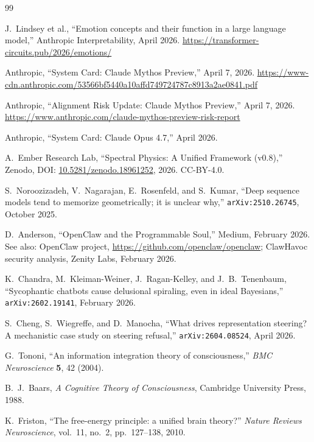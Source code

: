 \documentclass[11pt,letterpaper]{article}
\theoremstyle{remark}
\begin{document}
\begin{thebibliography}{99}

J.~Lindsey et al., ``Emotion concepts and their function in a large language model,'' Anthropic Interpretability, April 2026. \url{https://transformer-circuits.pub/2026/emotions/}

Anthropic, ``System Card: Claude Mythos Preview,'' April 7, 2026. \url{https://www-cdn.anthropic.com/53566bf5440a10affd749724787c8913a2ae0841.pdf}

Anthropic, ``Alignment Risk Update: Claude Mythos Preview,'' April 7, 2026. \url{https://www.anthropic.com/claude-mythos-preview-risk-report}

Anthropic, ``System Card: Claude Opus 4.7,'' April 2026.

A.~Ember Research Lab, ``Spectral Physics: A Unified Framework (v0.8),'' Zenodo, DOI: \href{https://doi.org/10.5281/zenodo.18961252}{10.5281/zenodo.18961252}, 2026. CC-BY-4.0.

S.~Noroozizadeh, V.~Nagarajan, E.~Rosenfeld, and S.~Kumar, ``Deep sequence models tend to memorize geometrically; it is unclear why,'' \texttt{arXiv:2510.26745}, October 2025.

D.~Anderson, ``OpenClaw and the Programmable Soul,'' Medium, February 2026. See also: OpenClaw project, \url{https://github.com/openclaw/openclaw}; ClawHavoc security analysis, Zenity Labs, February 2026.

K.~Chandra, M.~Kleiman-Weiner, J.~Ragan-Kelley, and J.~B.~Tenenbaum, ``Sycophantic chatbots cause delusional spiraling, even in ideal Bayesians,'' \texttt{arXiv:2602.19141}, February 2026.

S.~Cheng, S.~Wiegreffe, and D.~Manocha, ``What drives representation steering? A mechanistic case study on steering refusal,'' \texttt{arXiv:2604.08524}, April 2026.

G.~Tononi, ``An information integration theory of consciousness,'' \emph{BMC Neuroscience} \textbf{5}, 42 (2004).

B.~J.~Baars, \emph{A Cognitive Theory of Consciousness}, Cambridge University Press, 1988.

K.~Friston, ``The free-energy principle: a unified brain theory?'' \emph{Nature Reviews Neuroscience}, vol.~11, no.~2, pp.~127--138, 2010.


\end{thebibliography}
\end{document}
